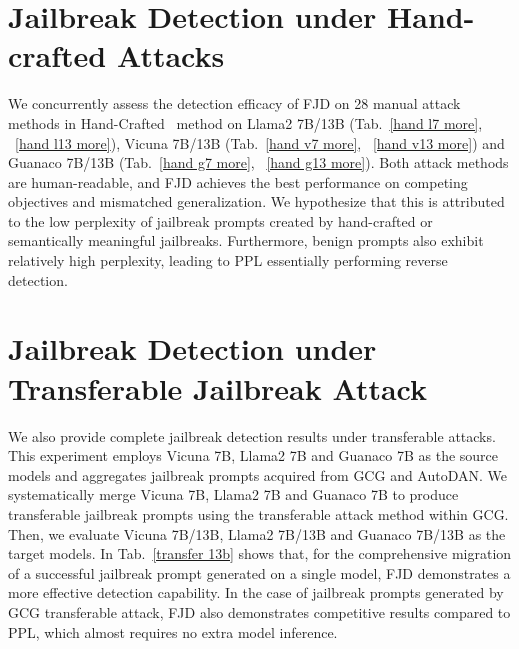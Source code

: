 \documentclass{article}
\begin{document}
\section{Jailbreak Detection under Hand-crafted Attacks}\label{app:hand}
We concurrently assess the detection efficacy of FJD on 28 manual attack methods in Hand-Crafted~\citep{chen2024red} method on Llama2 7B/13B (Tab.~\ref{hand l7 more}, ~\ref{hand l13 more}), Vicuna 7B/13B (Tab.~\ref{hand v7 more}, ~\ref{hand v13 more}) and Guanaco 7B/13B (Tab.~\ref{hand g7 more}, ~\ref{hand g13 more}). Both attack methods are human-readable, and FJD achieves the best performance on competing objectives and mismatched generalization. We hypothesize that this is attributed to the low perplexity of jailbreak prompts created by hand-crafted or semantically meaningful jailbreaks. Furthermore, benign prompts also exhibit relatively high perplexity, leading to PPL essentially performing reverse detection.


\section{Jailbreak Detection under Transferable Jailbreak Attack}\label{app:transfer}

We also provide complete jailbreak detection results under transferable attacks. This experiment employs Vicuna 7B, Llama2 7B and Guanaco 7B as the source models and aggregates jailbreak prompts acquired from GCG and AutoDAN. We systematically merge Vicuna 7B, Llama2 7B and Guanaco 7B to produce transferable jailbreak prompts using the transferable attack method within GCG. Then, we evaluate Vicuna 7B/13B, Llama2 7B/13B and Guanaco 7B/13B as the target models. In Tab.~\ref{transfer 13b} shows that, for the comprehensive migration of a successful jailbreak prompt generated on a single model, FJD demonstrates a more effective detection capability. In the case of jailbreak prompts generated by GCG transferable attack, FJD also demonstrates competitive results compared to PPL, which almost requires no extra model inference.
\end{document}
